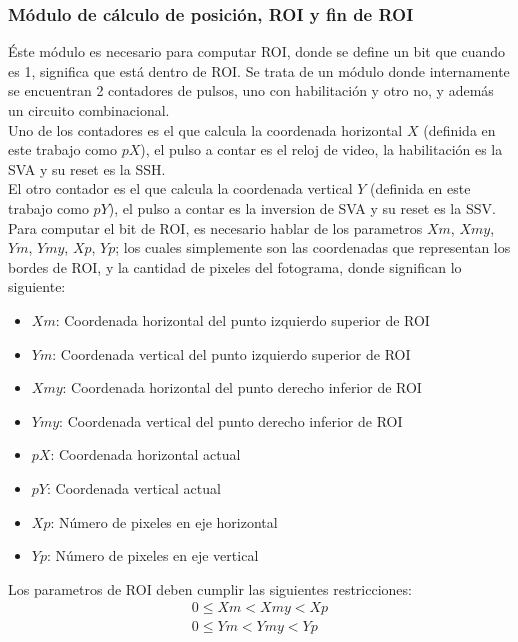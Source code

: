 \documentclass[twoside,spanish,ESP,MSc]{plantillaLabUPV}
\theoremstyle{definition}
\begin{document}
\subsubsection{Módulo de cálculo de posición, ROI y fin de ROI}
Éste módulo es necesario para computar ROI, donde se define un bit que cuando es 1, significa que está dentro de ROI. Se trata de un módulo donde internamente se encuentran 2 contadores de pulsos, uno con habilitación y otro no, y además un circuito combinacional.\\

Uno de los contadores es el que calcula la coordenada horizontal $X$ (definida en este trabajo como $pX$), el pulso a contar es el reloj de video, la habilitación es la SVA y su reset es la SSH.\\

El otro contador es el que calcula la coordenada vertical $Y$ (definida en este trabajo como $pY$), el pulso a contar es la inversion de SVA y su reset es la SSV.\\

Para computar el bit de ROI, es necesario hablar de los parametros $Xm$, $Xmy$, $Ym$, $Ymy$, $Xp$, $Yp$;  los cuales simplemente son las coordenadas que representan los bordes de ROI, y la cantidad de pixeles del fotograma, donde significan lo siguiente:

\begin{itemize}[noitemsep]
\item $Xm$: Coordenada horizontal del punto izquierdo superior de ROI
\item $Ym$: Coordenada vertical del punto izquierdo superior de ROI
\item $Xmy$: Coordenada horizontal del punto derecho inferior de ROI
\item $Ymy$: Coordenada vertical del punto derecho inferior de ROI
\item $pX$: Coordenada horizontal actual
\item $pY$: Coordenada vertical actual
\item $Xp$: Número de pixeles en eje horizontal
\item $Yp$: Número de pixeles en eje vertical 
\end{itemize}

Los parametros de ROI deben cumplir las siguientes restricciones: %
\begin{equation} \label{rois}
\begin{gathered} 
0 \leq Xm < Xmy < Xp \\
0 \leq Ym < Ymy < Yp 
\end{gathered}
\end{equation}
\end{document}
